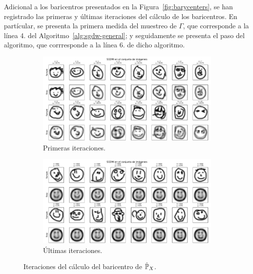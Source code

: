 
Adicional a los baricentros presentados en la Figura~\ref{fig:barycenters}, se han registrado las primeras y últimas iteraciones del cálculo de los baricentros. En partícular, se presenta la primera medida del muestreo de $\Gamma$, que corresponde a la línea 4. del  Algoritmo~\ref{alg:sgdw-general}; y seguidamente se presenta el paso del algoritmo, que corrresponde a la línea 6. de dicho algoritmo.

\begin{figure}[htbp]
    \centering
    \begin{subfigure}[b]{0.95\textwidth}
        \includegraphics[width=\textwidth]{img/sgdw-iters/first-iters-DS.pdf}
        \caption{Primeras iteraciones.}
        \label{fig:first-iters-DS}
    \end{subfigure}
    \newline
    \begin{subfigure}[b]{0.95\textwidth}
        \includegraphics[width=\textwidth]{img/sgdw-iters/last-iters-DS.pdf}
        \caption{Últimas iteraciones.}
        \label{fig:last-iters-DS}
    \end{subfigure}
    \caption{Iteraciones del cálculo del baricentro de $\hat\Prob_X$.}
    \label{fig:iters-DS}
\end{figure}

